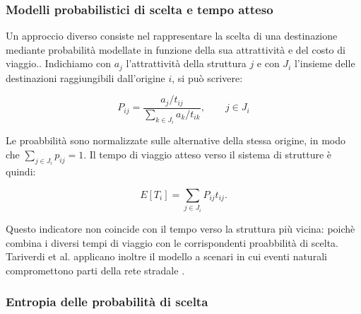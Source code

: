 \subsubsection{Modelli probabilistici di scelta e tempo atteso}

Un approccio diverso consiste nel rappresentare la scelta di una destinazione mediante probabilità modellate in funzione della sua attrattività e del costo di viaggio..
Indichiamo con $a_j$ l'attrattività della struttura $j$ e con $J_i$ l'insieme delle destinazioni raggiungibili dall'origine $i$, si può scrivere:

\begin{equation}
    P_{ij} = \frac{a_j/t_{ij}}{\displaystyle\sum_{k\in J_i}a_k/t_{ik}},\qquad j\in J_i
\end{equation}

Le proabbilità sono normalizzate sulle alternative della stessa origine, in modo che $\sum_{j\in J_i}p_{ij}=1$. Il tempo di viaggio atteso verso il sistema di strutture è quindi:

\begin{equation}
    E[T_i] = \sum_{j\in J_i}P_{ij}t_{ij}.
\end{equation}


Questo indicatore non coincide con il tempo verso la struttura più vicina: poichè combina i diversi tempi di viaggio con le corrispondenti proabbilità di scelta. Tariverdi et al. applicano inoltre il modello a scenari in cui eventi naturali compromettono parti della rete stradale \cite{tariverdi2023}.

\subsubsection{Entropia delle probabilità di scelta}

